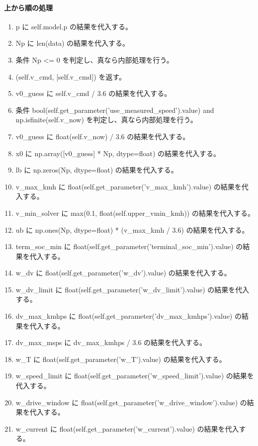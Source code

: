 \documentclass[a4paper,11pt]{article}
\begin{document}
            \paragraph{上から順の処理}
            \begin{enumerate}[leftmargin=1.8em]
            \item p に self.model.p の結果を代入する。
\item Np に len(data) の結果を代入する。
\item 条件 Np <= 0 を判定し、真なら内部処理を行う。
\item   (self.v\_cmd, [self.v\_cmd]) を返す。
\item v0\_guess に self.v\_cmd / 3.6 の結果を代入する。
\item 条件 bool(self.get\_parameter('use\_measured\_speed').value) and np.isfinite(self.v\_now) を判定し、真なら内部処理を行う。
\item   v0\_guess に float(self.v\_now) / 3.6 の結果を代入する。
\item x0 に np.array([v0\_guess] * Np, dtype=float) の結果を代入する。
\item lb に np.zeros(Np, dtype=float) の結果を代入する。
\item v\_max\_kmh に float(self.get\_parameter('v\_max\_kmh').value) の結果を代入する。
\item v\_min\_solver に max(0.1, float(self.upper\_vmin\_kmh)) の結果を代入する。
\item ub に np.ones(Np, dtype=float) * (v\_max\_kmh / 3.6) の結果を代入する。
\item term\_soc\_min に float(self.get\_parameter('terminal\_soc\_min').value) の結果を代入する。
\item w\_dv に float(self.get\_parameter('w\_dv').value) の結果を代入する。
\item w\_dv\_limit に float(self.get\_parameter('w\_dv\_limit').value) の結果を代入する。
\item dv\_max\_kmhps に float(self.get\_parameter('dv\_max\_kmhps').value) の結果を代入する。
\item dv\_max\_msps に dv\_max\_kmhps / 3.6 の結果を代入する。
\item w\_T に float(self.get\_parameter('w\_T').value) の結果を代入する。
\item w\_speed\_limit に float(self.get\_parameter('w\_speed\_limit').value) の結果を代入する。
\item w\_drive\_window に float(self.get\_parameter('w\_drive\_window').value) の結果を代入する。
\item w\_current に float(self.get\_parameter('w\_current').value) の結果を代入する。

\end{enumerate}
\end{document}
